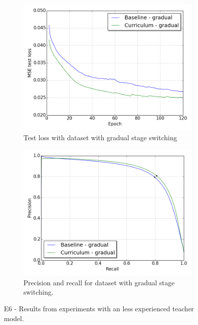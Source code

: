 \begin{figure}
\begin{subfigure}{0.5\textwidth}
\includegraphics[width=\linewidth]{figs/E6/E6_lc_gradual.png}
\caption{Test loss with dataset with gradual stage switching} \label{fig:E6_gradual_loss}
\end{subfigure}
\hspace*{\fill} %
\begin{subfigure}{0.5\textwidth}
\includegraphics[width=\linewidth]{figs/E6/E6_pr_gradual.png}
\caption{Precision and recall for dataset with gradual stage switching.} \label{fig:E6_gradual_pr}
\end{subfigure}
\hspace*{\fill} %
\caption[E6 - Results from experiments with a less experienced teacher ]{E6 - Results from experiments with an less experienced teacher model.} \label{fig:E6_curriculum_inexperienced}
\end{figure}

